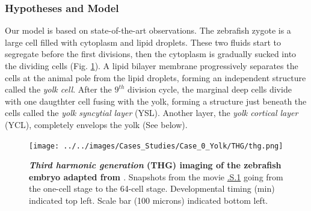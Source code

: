 \subsubsection{Hypotheses and Model}


Our model is based on state-of-the-art observations. The zebrafish zygote is a large cell filled with cytoplasm and lipid droplets. These two fluids start to segregate before the first divisions, then the cytoplasm is gradually sucked into the dividing cells (Fig. \ref{Case_0_Yolk_THG_thg}). A lipid bilayer membrane progressively separates the cells at the animal pole from the lipid droplets, forming an independent structure called the \textit{yolk cell}. After the $9^{th}$ division cycle, the marginal deep cells divide with one daugthter cell fusing with the yolk, forming a structure just beneath the cells called the \textit{yolk syncytial layer} (YSL). Another layer, the \textit{yolk cortical layer} (YCL), completely envelops the yolk (See below).
\begin{figure}
\begin{center}
\texttt{[image: ../../images/Cases\_Studies/Case\_0\_Yolk/THG/thg.png]}
\end{center}
\caption{\textbf{\textit{Third harmonic generation} (THG) imaging of the zebrafish embryo adapted from \cite{Olivier:2010jz}}. Snapshots from the movie \href{http://public.iscpif.fr/~delile/morphogenesis/manuscript/pragma/figure.html?name=Case_0_Yolk_1_THG_imaging_the_zebrafish_embryo_from_the_one_cell_stage}{.S.1} going from the one-cell stage to the 64-cell stage. Developmental timing (min) indicated top left. Scale bar (100 microns) indicated bottom left.}
\label{Case_0_Yolk_THG_thg}
\end{figure}

